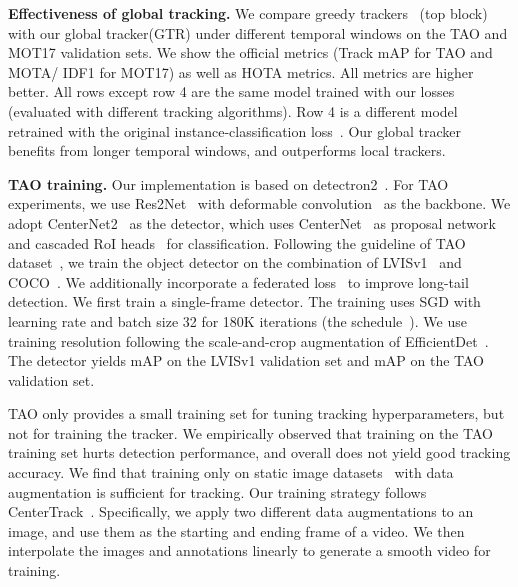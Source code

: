 \documentclass[10pt,twocolumn,letterpaper]{article}
\newcommand{\lbltbl}[1]{\label{tbl:#1}}
\newcommand{\rowNumber}[1]{\textcolor{Cerulean}{#1}}
\begin{document}
\begin{table*}[!t]
\caption{
\textbf{Effectiveness of global tracking.}
We compare greedy trackers~\cite{Bewley2016_sort,zhang2020fair} (top block) with our global tracker(GTR) under different temporal windows on the TAO and MOT17 validation sets. 
We show the official metrics (Track mAP for TAO and MOTA/ IDF1 for MOT17) as well as HOTA metrics. All metrics are higher better.
All rows except row \rowNumber{4} are the same model trained with our losses (evaluated with different tracking algorithms). 
Row \rowNumber{4} is a different model retrained with the original instance-classification loss~\cite{zhang2020fair}.
Our global tracker benefits from longer temporal windows, and outperforms local trackers.
}
\lbltbl{global}
\vspace{-5mm}
\end{table*}

\par \noindent \textbf{TAO training.}
Our implementation is based on detectron2~\cite{wu2019detectron2}.
For TAO~\cite{dave2020tao} experiments, we use Res2Net~\cite{gao2019res2net} with deformable convolution~\cite{dai2017deformable} as the backbone.
We adopt CenterNet2~\cite{zhou2021probablistic} as the detector, which uses CenterNet~\cite{zhou2019objects} as proposal network and 
cascaded RoI heads~\cite{cai2018cascade} for classification.
Following the guideline of TAO dataset~\cite{dave2020tao}, we train the object detector on the combination of LVISv1~\cite{gupta2019lvis} and COCO~\cite{lin2014microsoft}.
We additionally incorporate a federated loss~\cite{zhou2021probablistic} to improve long-tail detection.
We first train a single-frame detector.
The training uses SGD with learning rate  and batch size 32 for 180K iterations (the  schedule~\cite{wu2019detectron2}).
We use training resolution  following the scale-and-crop augmentation of EfficientDet~\cite{tan2020efficientdet}.
The detector yields  mAP on the LVISv1 validation set and  mAP on the TAO validation set.

TAO only provides a small training set for tuning tracking hyperparameters, but not for training the tracker.
We empirically observed that training on the TAO training set hurts detection performance, and overall does not yield good tracking accuracy.
We find that training only on static image datasets~\cite{gupta2019lvis} with data augmentation is sufficient for tracking.
Our training strategy follows CenterTrack~\cite{zhou2020tracking}.
Specifically, we apply two different data augmentations to an image, and use them as the starting and ending frame of a video.
We then interpolate the images and annotations linearly to generate a smooth video for training.
\end{document}
